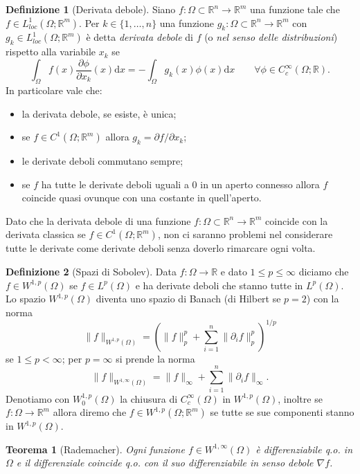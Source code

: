 \documentclass[a4paper,11pt]{book}
\theoremstyle{plain}
\newtheorem{teo}{Teorema}[chapter]
\theoremstyle{definition}
\newtheorem{defn}{Definizione}[chapter]
\theoremstyle{remark}
\newcommand{\R}{\mathbb{R}}
\newcommand{\norm}[1]{\lVert#1\rVert}
\newcommand{\dx}{\text{d}x}
\begin{document}
\begin{defn}[Derivata debole]
	Siano $f:\Omega\subset\R^n\to\R^m$ una funzione tale che $f\in L^1_{loc}(\Omega;\R^{m})$. Per  $k\in\{1,\ldots,n\}$ una funzione $g_k:\Omega\subset\R^n\to\R^{m}$ con $g_k\in L^1_{loc}(\Omega;\R^{m})$ è detta \textit{derivata debole} di $f$ (o \textit{nel senso delle distribuzioni}) rispetto alla variabile $x_k$ se
	\[
		\int_{\Omega} f(x)\frac{\partial\phi}{\partial x_k}(x)\dx = -\int_{\Omega} g_k(x)\phi(x)\dx\qquad \forall \phi\in C^{\infty}_c(\Omega;\R).
	\]
	In particolare vale che:
	\begin{itemize}
		\item la derivata debole, se esiste, è unica;
		\item se $f\in C^1(\Omega;\R^{m})$ allora $g_k = \partial f/\partial x_k$;
		\item le derivate deboli commutano sempre;
		\item se $f$ ha tutte le derivate deboli uguali a $0$ in un aperto connesso allora $f$ coincide quasi ovunque con una costante in quell'aperto.
	\end{itemize}
\end{defn}

Dato che la derivata debole di una funzione $f:\Omega\subset\R^{n}\to\R^{m}$ coincide con la derivata classica se $f\in C^{1}(\Omega;\R^{m})$, non ci saranno problemi nel considerare tutte le derivate come derivate deboli senza doverlo rimarcare ogni volta.

\begin{defn}[Spazi di Sobolev]
	Data $f:\Omega\to\R$ e dato $1\leq p\leq \infty$ diciamo che $f\in W^{1,p}(\Omega)$ se $f\in L^p(\Omega)$ e ha derivate deboli che stanno tutte in $L^p(\Omega)$.\\
	Lo spazio $W^{1,p}(\Omega)$ diventa uno spazio di Banach (di Hilbert se $p=2$) con la norma
	\[
		\norm{f}_{W^{1,p}(\Omega)} = \left(\norm{f}^p_p+\sum_{i=1}^n \norm{\partial_i f}_p^p \right)^{1/p}
	\]
	se $1\leq p < \infty$; per $p=\infty$ si prende la norma
	\[
		\norm{f}_{W^{1,\infty}(\Omega)}=\norm{f}_{\infty}+\sum_{i=1}^n \norm{\partial_i f}_{\infty}.
	\]
	Denotiamo con $W_0^{1,p}(\Omega)$ la chiusura di $C^{\infty}_c(\Omega)$ in $W^{1,p}(\Omega)$, inoltre se $f:\Omega\to\R^m$ allora diremo che $f\in W^{1,p}(\Omega;\R^m)$ se tutte se sue componenti stanno in $W^{1,p}(\Omega)$.
\end{defn}

\begin{teo}[Rademacher]\label{teo:9}
	Ogni funzione $f\in W^{1,\infty}(\Omega)$ è differenziabile q.o. in $\Omega$ e il differenziale coincide q.o. con il suo differenziabile in senso debole $\nabla f$.
\end{teo}
\end{document}
